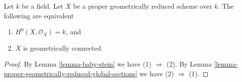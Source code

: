 \begin{lemma}
\label{lemma-geometrically-reduced-stein}
Let $k$ be a field. Let $X$ be a proper geometrically reduced scheme over $k$.
The following are equivalent
\begin{enumerate}
\item $H^0(X, \mathcal{O}_X) = k$, and
\item $X$ is geometrically connected.
\end{enumerate}
\end{lemma}

\begin{proof}
By Lemma \ref{lemma-baby-stein} we have (1) $\Rightarrow$ (2).
By Lemma \ref{lemma-proper-geometrically-reduced-global-sections}
we have (2) $\Rightarrow$ (1).
\end{proof}





